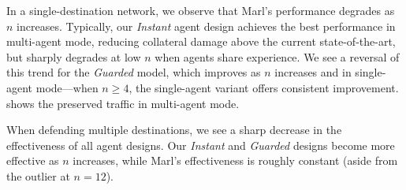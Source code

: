 \documentclass[10pt, times, conference, letterpaper]{IEEEtran}
\begin{document}
%	
%
%	
%
%	

In a single-destination network, we observe that Marl's performance degrades as $n$ increases.
Typically, our \emph{Instant} agent design achieves the best performance in multi-agent mode, reducing collateral damage above the current state-of-the-art, but sharply degrades at low $n$ when agents share experience.
We see a reversal of this trend for the \emph{Guarded} model, which improves as $n$ increases and in single-agent mode---when $n\ge4$, the single-agent variant offers consistent improvement.
 shows the preserved traffic in multi-agent mode.

When defending multiple destinations, we see a sharp decrease in the effectiveness of all agent designs.
Our \emph{Instant} and \emph{Guarded} designs become more effective as $n$ increases, while Marl's effectiveness is roughly constant (aside from the outlier at $n=12$).
\end{document}
